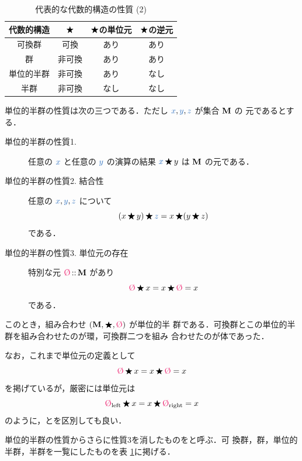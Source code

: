 \documentclass[a5paper,twoside,fleqn,draft]{jsbook}
\begin{document}
\begin{table}
\caption{代表的な代数的構造の性質 (2)}
\label{tab:group-and-monoid}
\begin{center}
\begin{tabular}{||c||c|c|c||}
\hline
代数的構造&$\operatorname{\bigstar}$&$\operatorname{\bigstar}$の単位元&$\operatorname{\bigstar}$の逆元\\
\hline\hline
可換群&可換&あり&あり\\
群&非可換&あり&あり\\
単位的半群&非可換&あり&なし\\
半群&非可換&なし&なし\\
\hline
\end{tabular}
\end{center}
\end{table}

単位的半群の性質は次の三つである．ただし $\hVar{x},\hVar{y},\hVar{z}$ が集合 $\mathbf{M}$ の
元であるとする．
\begin{description}
\item[単位的半群の性質1.] 任意の $\hVar{x}$ と任意の $\hVar{y}$ の演算の結果
$\hVar{x}\hAnyBinOp y$ は $\mathbf{M}$ の元である．
\item[単位的半群の性質2. 結合性] 任意の $\hVar{x},\hVar{y},\hVar{z}$ について
\begin{equation}
(x\hAnyBinOp y)\hAnyBinOp \hVar{z}=x\hAnyBinOp(y\hAnyBinOp z)
\end{equation}
である．
\item[単位的半群の性質3. 単位元の存在] 特別な元 $\mZero\mIn\mSet{M}$ があり
\begin{equation}
\mZero\hAnyBinOp x=x\hAnyBinOp\mZero=x
\end{equation}
である．
\end{description}
このとき，組み合わせ $\mTupleWith{\mSet{M},\hAnyBinOp,\mZero}$ が単位的半
群である．可換群とこの単位的半群を組み合わせたのが環，可換群二つを組み
合わせたのが体であった．

なお，これまで単位元の定義として
\begin{equation}
\mZero\hAnyBinOp x=x\hAnyBinOp\mZero=x
\end{equation}
を掲げているが，厳密には単位元は
\begin{equation}
\mZero_\mLeft\hAnyBinOp x=x\hAnyBinOp\mZero_\mRight=x
\end{equation}
のように，とを区別しても良い．

単位的半群の性質からさらに性質3を消したものをと呼ぶ．可
換群，群，単位的半群，半群を一覧にしたものを表
\ref{tab:group-and-monoid}に掲げる．
\end{document}
